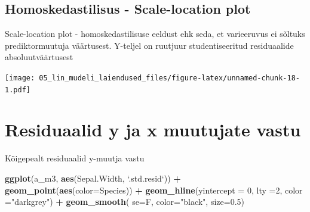 \documentclass[]{book}
\newenvironment{Shaded}{\begin{snugshade}}{\end{snugshade}}
\newcommand{\DataTypeTok}[1]{\textcolor[rgb]{0.13,0.29,0.53}{#1}}
\newcommand{\DecValTok}[1]{\textcolor[rgb]{0.00,0.00,0.81}{#1}}
\newcommand{\FloatTok}[1]{\textcolor[rgb]{0.00,0.00,0.81}{#1}}
\newcommand{\KeywordTok}[1]{\textcolor[rgb]{0.13,0.29,0.53}{\textbf{#1}}}
\newcommand{\NormalTok}[1]{#1}
\newcommand{\OperatorTok}[1]{\textcolor[rgb]{0.81,0.36,0.00}{\textbf{#1}}}
\newcommand{\OtherTok}[1]{\textcolor[rgb]{0.56,0.35,0.01}{#1}}
\newcommand{\StringTok}[1]{\textcolor[rgb]{0.31,0.60,0.02}{#1}}
\begin{document}
\hypertarget{homoskedastilisus---scale-location-plot}{%
\subsection*{Homoskedastilisus - Scale-location plot}\label{homoskedastilisus---scale-location-plot}}

Scale-location plot - homoskedastilisuse eeldust ehk seda, et varieeruvus ei sõltuks prediktormuutuja väärtusest. Y-teljel on ruutjuur studentiseeritud residuaalide absoluutväärtusest

\begin{Shaded}
\end{Shaded}

\texttt{[image: 05\_lin\_mudeli\_laiendused\_files/figure-latex/unnamed-chunk-18-1.pdf]}

\hypertarget{residuaalid-y-ja-x-muutujate-vastu}{%
\section*{Residuaalid y ja x muutujate vastu}\label{residuaalid-y-ja-x-muutujate-vastu}}

Kõigepealt residuaalid y-muutja vastu

\begin{Shaded}
\begin{Highlighting}[]
\KeywordTok{ggplot}\NormalTok{(a_m3, }\KeywordTok{aes}\NormalTok{(Sepal.Width, }\StringTok{`}\DataTypeTok{.std.resid}\StringTok{`}\NormalTok{)) }\OperatorTok{+}\StringTok{ }\KeywordTok{geom_point}\NormalTok{(}\KeywordTok{aes}\NormalTok{(}\DataTypeTok{color=}\NormalTok{Species)) }\OperatorTok{+}\StringTok{ }\KeywordTok{geom_hline}\NormalTok{(}\DataTypeTok{yintercept =} \DecValTok{0}\NormalTok{, }\DataTypeTok{lty =}\DecValTok{2}\NormalTok{, }\DataTypeTok{color =}\StringTok{"darkgrey"}\NormalTok{) }\OperatorTok{+}\StringTok{ }
\StringTok{  }\KeywordTok{geom_smooth}\NormalTok{( }\DataTypeTok{se=}\NormalTok{F, }\DataTypeTok{color=}\StringTok{"black"}\NormalTok{, }\DataTypeTok{size=}\FloatTok{0.5}\NormalTok{)}
\end{Highlighting}
\end{Shaded}
\end{document}
